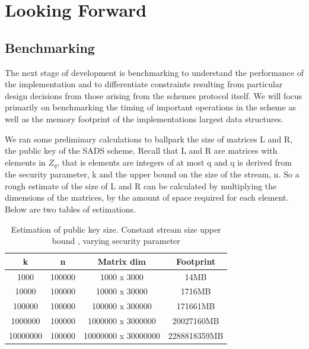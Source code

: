 \documentclass[11pt, letterpaper, oneside]{article}
\begin{document}
\section{Looking Forward}

	\subsection{ Benchmarking }
	
	The next stage of development is benchmarking to understand the performance of the implementation and to differentiate constraints resulting from particular design decisions from those arising from the schemes protocol itself.
	We will focus primarily on benchmarking the timing of important operations in the scheme as well as the memory footprint of the implementations largest data structures.
	
	We ran some preliminary calculations to ballpark the size of matrices L and R, the public key of the SADS scheme.
	Recall that L and R are matrices with elements in $Z_q$, that is elements are integers of at most q and q is derived from the security parameter, k and the upper bound on the size of the stream, n.
	So a rough estimate of the size of L and R can be calculated by multiplying the dimensions of the matrices, by the amount of space required for each element.
	Below are two tables of estimations.
	
	\begin{table}[h]
	\centering
	
		\begin{tabular} { c | c | c | c}
		
		k & n & Matrix dim & Footprint\\ \hline
		1000&100000&1000 x 3000&14MB\\
		10000&100000&10000 x 30000&1716MB\\
		100000&100000&100000 x 300000&171661MB\\
		1000000&100000&1000000 x 3000000&20027160MB\\
		10000000&100000&10000000 x 30000000&2288818359MB\\	
		\end{tabular}
	
	\caption{Estimation of public key size.  Constant stream size upper bound , varying security parameter } 
	\label{tab:pub-key_k}
	\end{table}
	
\end{document}
